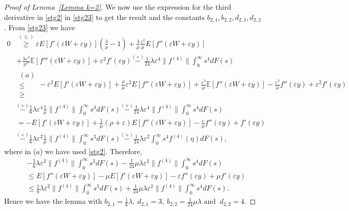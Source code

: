 \documentclass[10pt,a4paper]{amsart}
\begin{document}
\begin{proof}[Proof of Lemma~\ref{Lemma k=2}]
We now use the expression for the third derivative in \eqref{stg2} in \eqref{stg23} to get the result and the constants $b_{2,1}, b_{2,2}, d_{2,1},d_{2,2}$.
From \eqref{stg23} we have
\begin{align*}
    0
   &\stackrel{(\leq)} {\geq} \varepsilon E[f'(\varepsilon W+\varepsilon y)]\left(\frac{\lambda}{\mu}-1\right)+\frac{\lambda}{\mu}\frac{\varepsilon^2}{\mu}E[f''(\varepsilon W+\varepsilon y)]\\
    &+\frac{\lambda \varepsilon^3}{\mu^3}\mathbb E[f'''(\varepsilon W+\varepsilon y)]+\varepsilon^2f'(\varepsilon y)\stackrel{(+)}{-}\frac{1}{24}\lambda \varepsilon^4 \|f^{(4)}\| \int_0^\infty s^4 dF(s)\\
   & \mathrel{\substack{(a)\\ \leq \\ \geq}}-\varepsilon^2 E[f'(\varepsilon W+\varepsilon y)]+\frac{\rho}{\mu}\varepsilon^2E[f''(\varepsilon W+\varepsilon y)]+\frac{\varepsilon^3}{\mu}\mathbb E[f''(\varepsilon W+\varepsilon y)]-\frac{\varepsilon^3}{\mu}f''(\varepsilon y)+\varepsilon^2f'(\varepsilon y)\\
    &\stackrel{(+)}{-}\frac{1}{6} \lambda \varepsilon^4 \frac{1}{\mu}\|f^{(4)}\|\int_0^\infty s^3 dF(s)\stackrel{(+)}{-}\frac{1}{24}\lambda \varepsilon^4 \|f^{(4)}\|\int_0^\infty s^4dF(s)\\
    &=-E[f'(\varepsilon W+\varepsilon y)]+\frac{1}{\mu}(\rho+\varepsilon)E[f''(\varepsilon W+\varepsilon y)]-\frac{\varepsilon}{\mu}f''(\varepsilon y)+f'(\varepsilon y)\\
     &\stackrel{(+)}{-}\frac{1}{6} \lambda \varepsilon^2 \frac{1}{\mu}\|f^{(4)}\|\int_0^\infty s^3 dF(s)
     \stackrel{(+)}{-}\frac{1}{24}\lambda \varepsilon^2 \int_0^\infty s^4 f^{(4)}(\eta)dF(s),
\end{align*}
where in ($a$) we have used \eqref{stg2}. Therefore,
\begin{align}\label{stg3}
   \nonumber  &-\frac{1}{6} \lambda \varepsilon^2 \|f^{(4)}\|\int_0^\infty s^3 dF(s)-\frac{1}{24}\mu \lambda \varepsilon^2 \|f^{(4)}\| \int_0^\infty s^4 dF(s) \nonumber \\
   &\leq E[f''(\varepsilon W+\varepsilon y)]-\mu E[f'(\varepsilon W+\varepsilon y)]-\varepsilon f''(\varepsilon y)+\mu f'(\varepsilon y) \nonumber\\
     &\leq\frac{1}{6} \lambda \varepsilon^2 \|f^{(4)}\|\int_0^\infty s^3 dF(s)+\frac{1}{24}\mu \lambda \varepsilon^2 \|f^{(4)}\| \int_0^\infty s^4 dF(s).
\end{align}
Hence we have the lemma with $b_{2,1}=\frac{1}{6}\lambda, \ d_{2,1}=3,\ b_{2,2}=\frac{1}{24}\mu \lambda \text{ and }\  d_{2,2}=4$. 

\end{proof}
\end{document}
